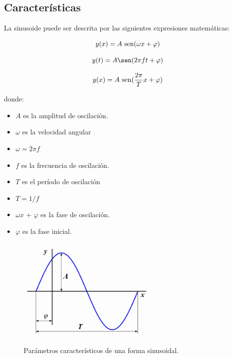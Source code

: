 \documentclass[]{article}
\begin{document}
\subsection{Características}

La sinusoide puede ser descrita por las siguientes expresiones matemáticas:

\begin{equation}
y(x) = A\ {\rm{sen}} (\omega x + \varphi)
\end{equation}

\begin{equation}
y(t) = A\sen(2 \pi f t + \varphi)
\end{equation}

\begin{equation}
y(x) = A\ {\rm{sen}}  (\frac {2\pi }{T}x + \varphi )
\end{equation}

donde:\\

\begin{itemize}
	\item $A$ es la amplitud de oscilación.
	\item $\omega$ es la velocidad angular  \item $\omega = 2\pi f$
	\item $f$ es la frecuencia de oscilación.
	\item $T$ es el período de oscilación  \item  $T = {1}/{f}$
	\item $\omega x$ + $\varphi$ es la fase de oscilación.
	\item $\varphi$ es la fase inicial.
\end{itemize}

\begin{figure}[h!]
	\centering
	\includegraphics[width=0.6\textwidth]{Imagenes/Alg_sinusoide.png}
	\caption{Parámetros característicos de una forma sinusoidal.}
	\label{fig:parametro_sinusoide}
\end{figure}
\end{document}
